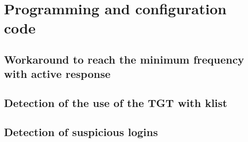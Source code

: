 
\chapter{Programming and configuration code}
%
%

\section*{Workaround to reach the minimum frequency with active response}

\linej

\linej

\linej

\section*{Detection of the use of the TGT with klist}

\linej

\linej

\linej

\section*{Detection of suspicious logins}

\linej

\linej

\linej

\linej


